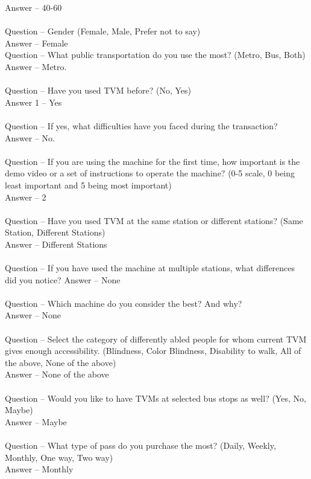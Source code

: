 \documentclass[a4paper, 11pt]{report}
\begin{document}
{Answer – 40-60\\\\
Question – Gender (Female, Male, Prefer not to say)\\
Answer – Female\\
Question – What public transportation do you use the most? (Metro, Bus, Both)\\
Answer – Metro.\\\\
Question – Have you used TVM before? (No, Yes)\\
Answer 1 – Yes\\\\
Question – If yes, what difficulties have you faced during the transaction?\\
Answer – No. \\\\
Question – If you are using the machine for the first time, how important is the demo video or a set of instructions to operate the machine? (0-5 scale, 0 being least important and 5 being most important)\\
Answer – 2\\\\
Question – Have you used TVM at the same station or different stations? (Same Station, Different Stations)\\
Answer – Different Stations\\\\
Question – If you have used the machine at multiple stations, what differences did you notice?
Answer – None\\\\
Question – Which machine do you consider the best? And why?\\
Answer – None\\\\
Question – Select the category of differently abled people for whom current TVM gives enough accessibility. (Blindness, Color Blindness, Disability to walk, All of the above, None of the above)\\
Answer – None of the above\\\\
Question – Would you like to have TVMs at selected bus stops as well? (Yes, No, Maybe)\\
Answer – Maybe\\\\
Question – What type of pass do you purchase the most? (Daily, Weekly, Monthly, One way, Two way)\\
Answer – Monthly\\\\
}
\end{document}
